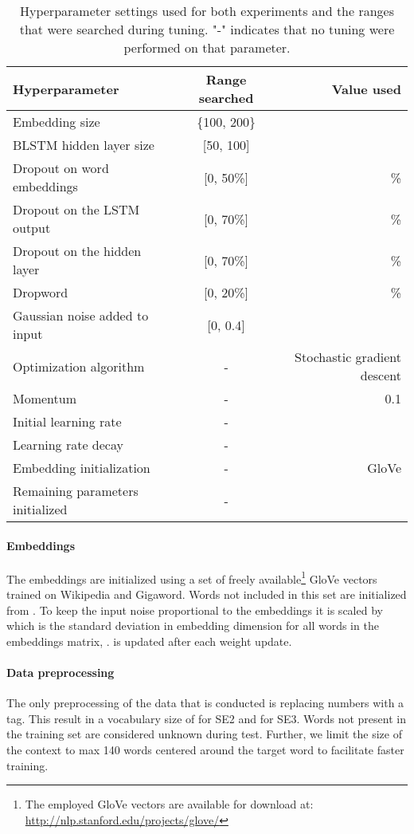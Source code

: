 \documentclass[11pt]{article}
\def\SEtwo{SE2}
\def\SEthree{SE3}
\def\glove{GloVe}
\begin{document}
\label{sec:experimentalsettings}
\begin{table}[tbh]
\centering
\begin{tabular*}{0.9\textwidth}{@{\extracolsep{\fill} } lcr }
\toprule 
\bf Hyperparameter & \bf Range searched & \bf Value used \\
\midrule
Embedding size & \{100, 200\} &  \\
BLSTM hidden layer size & [50, 100] &  \\ 
Dropout on word embeddings  & [0, 50\%] & \% \\
Dropout on the LSTM output  & [0, 70\%] & \% \\
Dropout on the hidden layer  & [0, 70\%] & \% \\
Dropword & [0, 20\%] & \% \\
Gaussian noise added to input & [0, 0.4] &  \\ 
\midrule
Optimization algorithm & - & Stochastic gradient descent\\
Momentum & - & 0.1 \\
Initial learning rate & - &  \\ Learning rate decay & - &  \\
Embedding initialization & - & \glove{} \\
Remaining parameters initialized & - &  \\
\bottomrule
\end{tabular*}
\caption{Hyperparameter settings used for both experiments and the ranges that were searched during tuning. "-" indicates that no tuning were performed on that parameter.}
\label{tbl:experimentalsettings}
\end{table}

\paragraph{Embeddings} The embeddings are initialized using a set of freely available\footnote{The employed \glove{} vectors are available for download at: \url{http://nlp.stanford.edu/projects/glove/}} \glove{} vectors trained on Wikipedia and Gigaword. Words not included in this set are initialized from .
To keep the input noise proportional to the embeddings it is scaled by  which is the standard deviation in embedding dimension  for all words in the embeddings matrix, .  is updated after each weight update.

\paragraph{Data preprocessing} The only preprocessing of the data that is conducted is replacing numbers with a  tag. This result in a vocabulary size of  for \SEtwo{} and  for \SEthree. Words not present in the training set are considered unknown during test. 
Further, we limit the size of the context to max 140 words centered around the target word to facilitate faster training.
\end{document}
